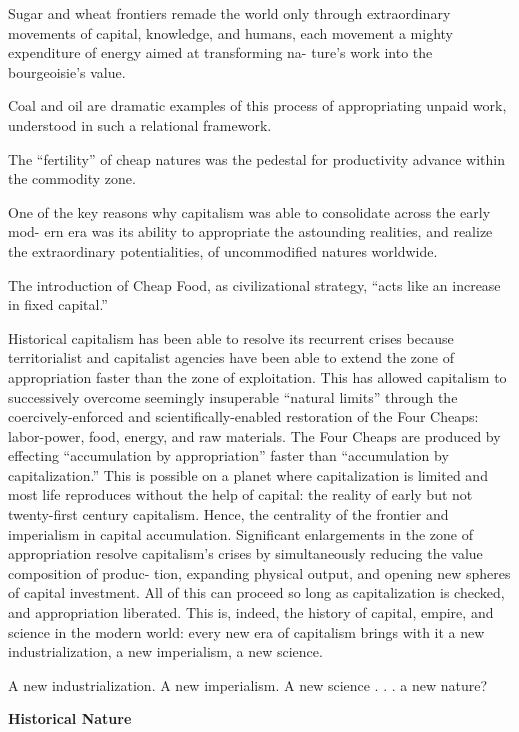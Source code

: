 \documentclass[
]{book}
\begin{document}
Sugar and wheat frontiers remade the world only through
extraordinary movements of capital, knowledge, and humans, each
movement a mighty expenditure of energy aimed at transforming na-
ture's work into the bourgeoisie's value.

Coal and oil are dramatic
examples of this process of appropriating unpaid work, understood
in such a relational framework.

The ``fertility'' of
cheap natures was the pedestal for productivity advance within the
commodity zone.

One of the key
reasons why capitalism was able to consolidate across the early mod-
ern era was its ability to appropriate the astounding realities, and
realize the extraordinary potentialities, of uncommodified natures
worldwide.

The introduction of Cheap
Food, as civilizational strategy, ``acts like an increase in fixed capital.''

Historical capitalism has been able to resolve its recurrent
crises because territorialist and capitalist agencies have been able to
extend the zone of appropriation faster than the zone of exploitation.
This has allowed capitalism to successively overcome seemingly
insuperable ``natural limits'' through the coercively-enforced and
scientifically-enabled restoration of the Four Cheaps: labor-power,
food, energy, and raw materials. The Four Cheaps are produced by
effecting ``accumulation by appropriation'' faster than ``accumulation
by capitalization.'' This is possible on a planet where capitalization is
limited and most life reproduces without the help of capital: the
reality of early but not twenty-first century capitalism. Hence, the
centrality of the frontier and imperialism in capital accumulation.
Significant enlargements in the zone of appropriation resolve capitalism's
crises by simultaneously reducing the value composition of produc-
tion, expanding physical output, and opening new spheres of capital
investment. All of this can proceed so long as capitalization is
checked, and appropriation liberated. This is, indeed, the history of
capital, empire, and science in the modern world: every new era of
capitalism brings with it a new industrialization, a new imperialism, a
new science.

A new industrialization. A new imperialism. A new science . . . a
new nature?

\textbf{Historical Nature}
\end{document}

